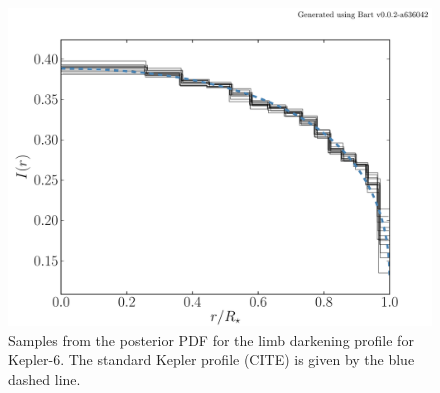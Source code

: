 \documentclass[12pt,preprint]{aastex}
\newcommand{\figlabel}[1]{\label{fig:#1}}
\begin{document}
\begin{figure}[htbp]
    \begin{center}
        \includegraphics[width=\textwidth]{figures/k6-ldp.pdf}
    \end{center}
    \caption{Samples from the posterior PDF for the limb darkening profile for
        Kepler-6. The standard Kepler profile (CITE) is given by the blue
        dashed line. \figlabel{k6-ldp}}
\end{figure}
\end{document}
